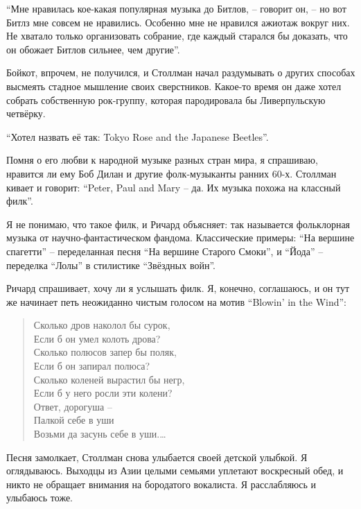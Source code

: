 \enquote{Мне нравилась кое-какая популярная музыка до Битлов, -- говорит он, -- но вот Битлз мне совсем не нравились. Особенно мне не нравился ажиотаж вокруг них. Не хватало только организовать собрание, где каждый старался бы доказать, что он обожает Битлов сильнее, чем другие}.

Бойкот, впрочем, не получился, и Столлман начал раздумывать о других способах высмеять стадное мышление своих сверстников. Какое-то время он даже хотел собрать собственную рок-группу, которая пародировала бы Ливерпульскую четвёрку.

\enquote{Хотел назвать её так: Tokyo Rose and the Japanese Beetles}.

Помня о его любви к народной музыке разных стран мира, я спрашиваю, нравится ли ему Боб Дилан и другие фолк-музыканты ранних 60-х. Столлман кивает и говорит: \enquote{Peter, Paul and Mary -- да. Их музыка похожа на классный филк}.

Я не понимаю, что такое филк, и Ричард объясняет: так называется фольклорная музыка от научно-фантастическом фандома. Классические примеры: \enquote{На вершине спагетти} -- переделанная песня \enquote{На вершине Старого Смоки}, и \enquote{Йода} -- переделка  \enquote{Лолы} в стилистике \enquote{Звёздных войн}.

Ричард спрашивает, хочу ли я услышать филк. Я, конечно, соглашаюсь, и он тут же начинает петь неожиданно чистым голосом на мотив \enquote{Blowin' in the Wind}:

\begin{verse}
Сколько дров наколол бы сурок,\\
Если б он умел колоть дрова?\\
Сколько полюсов запер бы поляк,\\
Если б он запирал полюса?\\
Сколько коленей вырастил бы негр,\\
Если б у него росли эти колени?\\
Ответ, дорогуша --\\
Палкой себе в уши\\
Возьми да засунь себе в уши.\ldots
\end{verse}

Песня замолкает, Столлман снова улыбается своей детской улыбкой. Я оглядываюсь. Выходцы из Азии целыми семьями уплетают воскресный обед, и никто не обращает внимания на бородатого вокалиста. Я расслабляюсь и улыбаюсь тоже. 

